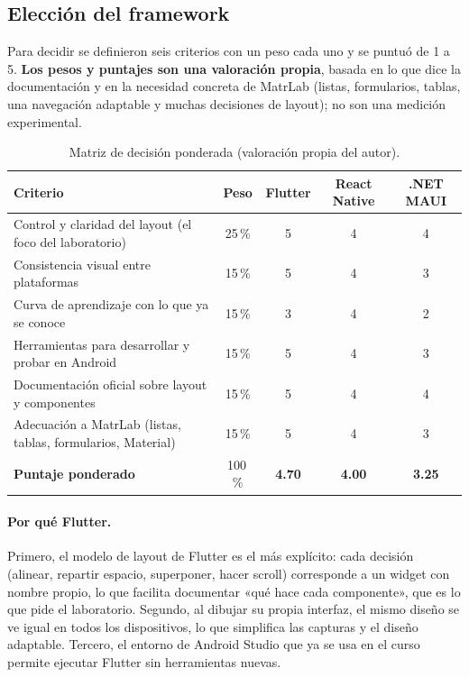 \subsection{Elección del framework}
\label{sec:eleccion}
Para decidir se definieron seis criterios con un peso cada uno y se puntuó de 1 a 5. \textbf{Los pesos y puntajes son una valoración propia}, basada en lo que dice la documentación y en la necesidad concreta de MatrLab (listas, formularios, tablas, una navegación adaptable y muchas decisiones de layout); no son una medición experimental.

\begin{table}[H]
	\centering\footnotesize
	\begin{tabularx}{\textwidth}{|X|c|c|c|c|}
		\hline
		\rowcolor{tablebackground}\color{white}\textbf{Criterio} & \color{white}\textbf{Peso} & \color{white}\textbf{Flutter} & \color{white}\textbf{React Native} & \color{white}\textbf{.NET MAUI}\\
		\hline
		Control y claridad del layout (el foco del laboratorio) & 25\,\% & 5 & 4 & 4 \\\hline
		Consistencia visual entre plataformas & 15\,\% & 5 & 4 & 3 \\\hline
		Curva de aprendizaje con lo que ya se conoce & 15\,\% & 3 & 4 & 2 \\\hline
		Herramientas para desarrollar y probar en Android & 15\,\% & 5 & 4 & 3 \\\hline
		Documentación oficial sobre layout y componentes & 15\,\% & 5 & 4 & 4 \\\hline
		Adecuación a MatrLab (listas, tablas, formularios, Material) & 15\,\% & 5 & 4 & 3 \\\hline
		\textbf{Puntaje ponderado} & 100\,\% & \textbf{4.70} & \textbf{4.00} & \textbf{3.25} \\\hline
	\end{tabularx}
	\caption{Matriz de decisión ponderada (valoración propia del autor).}
	\label{tab:decision}
\end{table}


\paragraph{Por qué Flutter.} Primero, el modelo de layout de Flutter es el más explícito: cada decisión (alinear, repartir espacio, superponer, hacer scroll) corresponde a un widget con nombre propio, lo que facilita documentar «qué hace cada componente», que es lo que pide el laboratorio. Segundo, al dibujar su propia interfaz, el mismo diseño se ve igual en todos los dispositivos, lo que simplifica las capturas y el diseño adaptable. Tercero, el entorno de Android Studio que ya se usa en el curso permite ejecutar Flutter sin herramientas nuevas.

